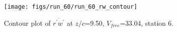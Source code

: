 \begin{figure}[H]
\centering
\texttt{[image: figs/run\_60/run\_60\_rw\_contour]}
\caption{Contour plot of $\overline{r^\prime w^\prime}$ at $z/c$=9.50, $V_{free}$=33.04, station 6.}
\label{fig:run_60_rw_contour}
\end{figure}


